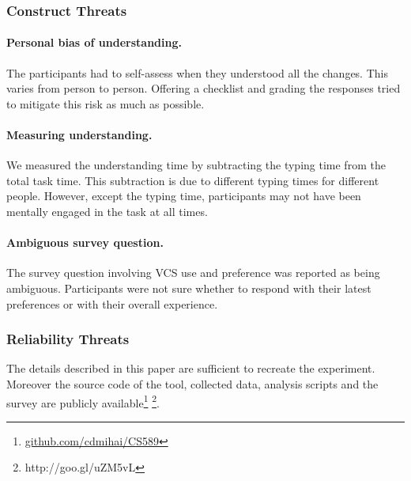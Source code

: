 \documentclass[letterpaper]{article}
\begin{document}
\subsubsection{Construct Threats}

\paragraph{Personal bias of understanding.}
The participants had to self-assess when they understood all the changes. 
This varies from person to person. 
Offering a checklist and grading the responses tried to mitigate this risk as much as possible.

\paragraph{Measuring understanding.}
We measured the understanding time by subtracting the typing time from the total task time.
This subtraction is due to different typing times for different people.
However, except the typing time, participants may not have been mentally engaged in the task at all times.

\paragraph{Ambiguous survey question.}
The survey question involving VCS use and preference was reported as being ambiguous.
Participants were not sure whether to respond with their latest preferences or with their overall experience.

\subsubsection{Reliability Threats}

The details described in this paper are sufficient to recreate the experiment.
Moreover the source code of the tool, collected data, analysis scripts and the survey are publicly available\footnote{\url{github.com/cdmihai/CS589}} \footnote{http://goo.gl/uZM5vL}.
\end{document}
